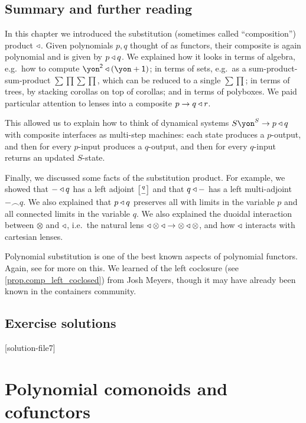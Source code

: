 \documentclass[Book-Poly]{subfiles}
\begin{document}
\section{Summary and further reading}

In this chapter we introduced the substitution (sometimes called ``composition'') product $\mathbin{\triangleleft}$. Given polynomials $p,q$ thought of as functors, their composite is again polynomial and is given by $p\mathbin{\triangleleft} q$. We explained how it looks in terms of algebra, e.g.\ how to compute $\yon^\2\tri(\yon+\1)$; in terms of sets, e.g.\ as a sum-product-sum-product $\sum\prod\sum\prod$, which can be reduced to a single $\sum\prod$; in terms of trees, by stacking corollas on top of corollas; and in terms of polyboxes. We paid particular attention to lenses into a composite $p\to q\mathbin{\triangleleft} r$.

This allowed us to explain how to think of dynamical systems $S\yon^S\to p\tri q$ with composite interfaces as multi-step machines: each state produces a $p$-output, and then for every $p$-input produces a $q$-output, and then for every $q$-input returns an updated $S$-state.

Finally, we discussed some facts of the substitution product. For example, we showed that $-\mathbin{\triangleleft} q$ has a left adjoint $\lchom{q}{-}$ and that $q\mathbin{\triangleleft} -$ has a left multi-adjoint $-\frown q$. We also explained that $p\mathbin{\triangleleft} q$ preserves all with limits in the variable $p$ and all connected limits in the variable $q$. We also explained the duoidal interaction between $\otimes$ and $\mathbin{\triangleleft}$, i.e.\ the natural lens $\mathbin{\triangleleft}\otimes\mathbin{\triangleleft}\to\otimes\mathbin{\triangleleft}\otimes$, and how $\mathbin{\triangleleft}$ interacts with cartesian lenses.

Polynomial substitution is one of the best known aspects of polynomial functors. Again, see \cite{kock2012polynomial} for more on this. We learned of the left coclosure (see \cref{prop.comp_left_coclosed}) from Josh Meyers, though it may have already been known in the containers community.
\section{Exercise solutions}
{\footnotesize
}

[solution-file7]


\chapter{Polynomial comonoids and cofunctors}\label{ch.comon.sharp}
\end{document}
